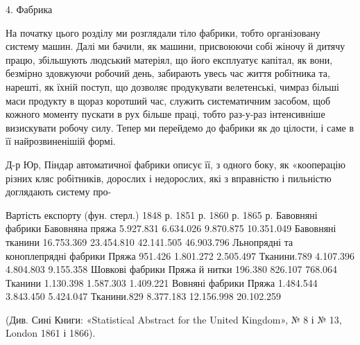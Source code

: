 4. Фабрика

На початку цього розділу ми розглядали тіло фабрики, тобто
організовану систему машин. Далі ми бачили, як машини, присвоюючи
собі жіночу й дитячу працю, збільшують людський
матеріял, що його експлуатує капітал, як вони, безмірно здовжуючи
робочий день, забирають увесь час життя робітника та,
нарешті, як їхній поступ, що дозволяє продукувати велетенські,
чимраз більші маси продукту в щораз коротший час, служить
систематичним засобом, щоб кожного моменту пускати в рух
більше праці, тобто раз-у-раз інтенсивніше визискувати робочу
силу. Тепер ми перейдемо до фабрики як до цілости, і саме в її
найрозвиненішій формі.

Д-р Юр, Піндар автоматичної фабрики описує її, з одного
боку, як «кооперацію різних кляс робітників, дорослих і недорослих,
які з вправністю і пильністю доглядають систему про-

                                                                            Вартість експорту (фун.
стерл.)
                                                       1848 р.                    1851 р.
   1860 р.               1865 р.
Бавовняні фабрики
Бавовняна пряжа                  5.927.831                6.634.026             9.870.875
10.351.049
Бавовняні тканини                 16.753.369           23.454.810        42.141.505
46.903.796
Льнопрядні та коноплепрядні фабрики
Пряжа                 951.426             1.801.272
       2.505.497
Тканини.789             4.107.396             4.804.803
    9.155.358
Шовкові фабрики
Пряжа й нитки                 196.380              826.107
     768.064
Тканини               1.130.398          1.587.303
    1.409.221
Вовняні фабрики
Пряжа              1.484.544            3.843.450
   5.424.047
Тканини.829             8.377.183           12.156.998
 20.102.259

(Див. Сині Книги: «Statistical Abstract for the United Kingdom»,
№ 8 і № 13, London 1861 і 1866).

